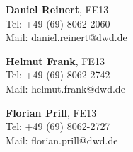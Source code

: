 \begin{note}
\begin{minipage}{\textwidth}
\centering
\begin{minipage}{0.32\textwidth}
 \textbf{Daniel Reinert}, FE13 \\
 Tel: +49 (69) 8062-2060 \\ 
 Mail: daniel.reinert@dwd.de
\end{minipage}
\begin{minipage}{0.32\textwidth}
 \textbf{Helmut Frank}, FE13\\
 Tel: +49 (69) 8062-2742 \\ 
 Mail: helmut.frank@dwd.de
\end{minipage}
\begin{minipage}{0.32\textwidth}
 \textbf{Florian Prill}, FE13 \\
 Tel: +49 (69) 8062-2727 \\ 
 Mail: florian.prill@dwd.de
\end{minipage}
\end{minipage}
\end{note}  